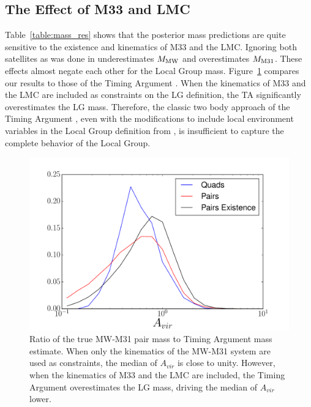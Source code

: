 \documentclass[iop,apj,twocolappendix,numberedappendix]{emulateapj}
\newcommand{\MMW}{{\rm M}_{\rm MW}}
\def\Fref#1{Figure~\ref{#1}}
\def\Tref#1{Table~\ref{#1}}
\def\MMW{M_{\rm MW}}
\def\MEI{M_{\rm M31}}
\begin{document}


\subsection{The Effect of M33 and LMC}
\label{sec:existence}
\Tref{table:mass_res} shows that the posterior mass predictions are quite sensitive to the existence and kinematics of M33 and the LMC. 
Ignoring both satellites as was done in \cite{gonzalez2014mass} underestimates $\MMW$ and overestimates $\MEI$. These effects almost negate each other for the Local Group mass. \Fref{fig:ta_plot} compares our results to those of the Timing Argument \citep{Timing}. When the kinematics of M33 and the LMC are included as constraints on the LG definition, the TA significantly overestimates the LG mass.
Therefore, the classic two body approach of the Timing Argument \citep{Timing}, even with the modifications to include local environment variables in the Local Group definition from \cite{gonzalez2014mass}, is insufficient to capture the complete behavior of the Local Group.


\begin{figure}[ht]
\includegraphics[width=\linewidth]{figures/timing_plot.pdf}
\caption{Ratio of the true MW-M31 pair mass to Timing Argument mass estimate. When only the kinematics of the MW-M31 system are used as constraints, the median of $A_{vir}$ is close to unity. However, when the kinematics of M33 and the LMC are included, the Timing Argument overestimates the LG mass, driving the median of $A_{vir}$ lower.}
\label{fig:ta_plot}
\end{figure}
\end{document}
